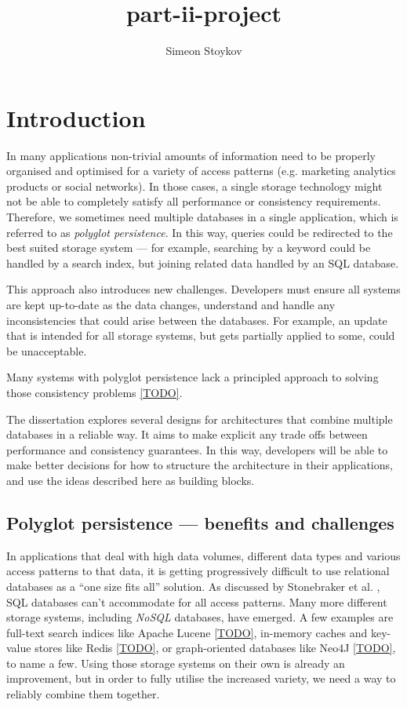\documentclass[12pt]{article}
\title{part-ii-project}
\author{Simeon Stoykov}
\begin{document}
\maketitle

\section{Introduction}

In many applications non-trivial amounts of information need to be properly organised and optimised for a variety of access patterns (e.g. marketing analytics products or social networks). In those cases, a single storage technology might not be able to completely satisfy all performance or consistency requirements. Therefore, we sometimes need multiple databases in a single application, which is referred to as \textit{polyglot persistence}. In this way, queries could be redirected to the best suited storage system --- for example, searching by a keyword could be handled by a search index, but joining related data handled by an SQL database.

This approach also introduces new challenges. Developers must ensure all systems are kept up-to-date as the data changes, understand and handle any inconsistencies that could arise between the databases. For example, an update that is intended for all storage systems, but gets partially applied to some, could be unacceptable.

Many systems with polyglot persistence lack a principled approach to solving those consistency problems \ref{TODO}. 

The dissertation explores several designs for architectures that combine multiple databases in a reliable way. It aims to make explicit any trade offs between performance and consistency guarantees. In this way, developers will be able to make better decisions for how to structure the architecture in their applications, and use the ideas described here as building blocks.

\subsection{Polyglot persistence --- benefits and challenges}

In applications that deal with high data volumes, different data types and various access patterns to that data, it is getting progressively difficult to use relational databases as a ``one size fits all'' solution. As discussed by Stonebraker et al. \cite{oneSize}, SQL databases can't accommodate for all access patterns. Many more different storage systems, including \textit{NoSQL} databases, have emerged. A few examples are full-text search indices like Apache Lucene \ref{TODO}, in-memory caches and key-value stores like Redis \ref{TODO}, or graph-oriented databases like Neo4J \ref{TODO}, to name a few. Using those storage systems on their own is already an improvement, but in order to fully utilise the increased variety, we need a way to reliably combine them together.
\end{document}
